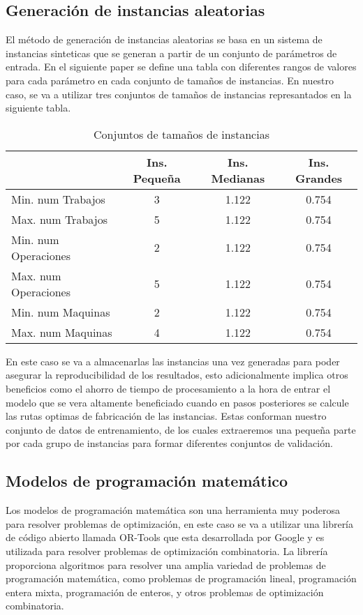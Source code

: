 \subsection{Generación de instancias aleatorias}
El método de generación de instancias aleatorias se basa en un sistema de instancias sinteticas
que se generan a partir de un conjunto de parámetros de entrada. En el siguiente paper \cite{pbrandimarte}
se define una tabla con diferentes rangos de valores para cada parámetro en cada conjunto de
tamaños de instancias. En nuestro caso, se va a utilizar tres conjuntos de tamaños de instancias
represantados en la siguiente tabla.

\begin{table}[ht]
    \centering
    \begin{tabular}[t]{|l|ccc|}
        \hline
                  & Ins. Pequeña & Ins. Medianas & Ins. Grandes \\
        \hline
        Min. num Trabajos    & 3    & 1.122    & 0.754 \\
        Max. num Trabajos    & 5    & 1.122    & 0.754 \\
        Min. num Operaciones & 2    & 1.122    & 0.754 \\
        Max. num Operaciones & 5    & 1.122    & 0.754 \\
        Min. num Maquinas    & 2    & 1.122    & 0.754 \\
        Max. num Maquinas    & 4    & 1.122    & 0.754 \\
        \hline
    \end{tabular}
    \caption{Conjuntos de tamaños de instancias}
\end{table}

En este caso se va a almacenarlas las instancias una vez generadas para poder asegurar la reproducibilidad 
de los resultados, esto adicionalmente implica otros beneficios como el ahorro de tiempo de procesamiento
a la hora de entrar el modelo que se vera altamente beneficiado cuando en pasos posteriores se calcule
las rutas optimas de fabricación de las instancias. Estas conforman nuestro conjunto de datos de 
entrenamiento, de los cuales extraeremos una pequeña parte por cada grupo de instancias para formar
diferentes conjuntos de validación. 

\subsection{Modelos de programación matemático}
Los modelos de programación matemática son una herramienta muy poderosa para resolver problemas
de optimización, en este caso se va a utilizar una librería de código abierto llamada OR-Tools 
\cite{ortools} que esta desarrollada por Google y es utilizada para resolver problemas de optimización 
combinatoria. La librería proporciona algoritmos para resolver una amplia variedad de problemas 
de programación matemática, como problemas de programación lineal, programación entera mixta, 
programación de enteros, y otros problemas de optimización combinatoria.\medskip 

